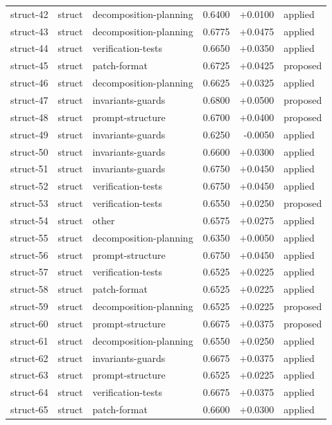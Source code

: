 \begin{center}
\begin{longtable}{llp{5.2cm}rrl}
struct-42 & struct & decomposition-planning & 0.6400 & +0.0100 & applied \\
struct-43 & struct & decomposition-planning & 0.6775 & +0.0475 & applied \\
struct-44 & struct & verification-tests & 0.6650 & +0.0350 & applied \\
struct-45 & struct & patch-format & 0.6725 & +0.0425 & proposed \\
struct-46 & struct & decomposition-planning & 0.6625 & +0.0325 & applied \\
struct-47 & struct & invariants-guards & 0.6800 & +0.0500 & proposed \\
struct-48 & struct & prompt-structure & 0.6700 & +0.0400 & proposed \\
struct-49 & struct & invariants-guards & 0.6250 & -0.0050 & applied \\
struct-50 & struct & invariants-guards & 0.6600 & +0.0300 & applied \\
struct-51 & struct & invariants-guards & 0.6750 & +0.0450 & applied \\
struct-52 & struct & verification-tests & 0.6750 & +0.0450 & applied \\
struct-53 & struct & verification-tests & 0.6550 & +0.0250 & proposed \\
struct-54 & struct & other & 0.6575 & +0.0275 & applied \\
struct-55 & struct & decomposition-planning & 0.6350 & +0.0050 & applied \\
struct-56 & struct & prompt-structure & 0.6750 & +0.0450 & applied \\
struct-57 & struct & verification-tests & 0.6525 & +0.0225 & applied \\
struct-58 & struct & patch-format & 0.6525 & +0.0225 & applied \\
struct-59 & struct & decomposition-planning & 0.6525 & +0.0225 & proposed \\
struct-60 & struct & prompt-structure & 0.6675 & +0.0375 & proposed \\
struct-61 & struct & decomposition-planning & 0.6550 & +0.0250 & applied \\
struct-62 & struct & invariants-guards & 0.6675 & +0.0375 & applied \\
struct-63 & struct & prompt-structure & 0.6525 & +0.0225 & applied \\
struct-64 & struct & verification-tests & 0.6675 & +0.0375 & applied \\
struct-65 & struct & patch-format & 0.6600 & +0.0300 & applied \\

\end{longtable}
\end{center}
